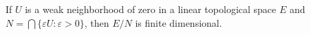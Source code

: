 If $U$ is a weak neighborhood of zero in a linear topological space $E$ and $N = \bigcap \{\varepsilon U : \varepsilon > 0\}$, then $E/N$ is finite dimensional.
